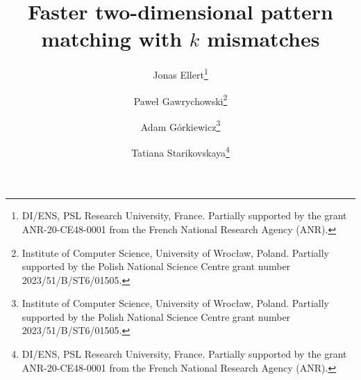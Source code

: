 \documentclass[a4paper,11pt]{article}
\begin{document}
\title{Faster two-dimensional pattern matching with $k$ mismatches}
%

\author{Jonas Ellert\thanks{DI/ENS, PSL Research University, France. Partially supported by the grant ANR-20-CE48-0001 from the French National Research Agency (ANR).}
\and Paweł Gawrychowski\thanks{Institute of Computer Science, University of Wrocław, Poland. Partially supported by the Polish National Science Centre grant number 2023/51/B/ST6/01505.}
\and Adam Górkiewicz\thanks{Institute of Computer Science, University of Wrocław, Poland. Partially supported by the Polish National Science Centre grant number 2023/51/B/ST6/01505.}
\and Tatiana Starikovskaya\thanks{DI/ENS, PSL Research University, France. Partially supported by the grant ANR-20-CE48-0001 from the French National Research Agency (ANR).}
}



\date{}
\maketitle
\end{document}
